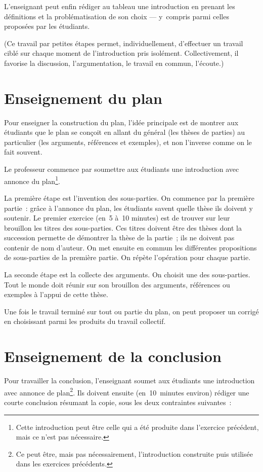\documentclass[a4paper,12pt]{report}
\begin{document}
L'enseignant peut enfin rédiger au tableau une introduction en prenant
les définitions et la problématisation de son choix — y compris parmi
celles proposées par les étudiants.

(Ce travail par petites étapes permet, individuellement, d'effectuer un
travail ciblé sur chaque moment de l'introduction pris isolément.
Collectivement, il favorise la discussion, l'argumentation, le travail
en commun, l'écoute.)


\chapter{Enseignement du plan}
\label{sec:orga70ca2f}

Pour enseigner la construction du plan, l'idée principale est de montrer
aux étudiants que le plan se conçoit en allant du général (les thèses de
parties) au particulier (les arguments, références et exemples), et non
l'inverse comme on le fait souvent.

Le professeur commence par soumettre aux étudiants une introduction avec
annonce du plan\footnote{Cette introduction peut être celle qui a été produite dans
l'exercice précédent, mais ce n'est pas nécessaire.}. 

La première étape est l'invention des sous-parties. On commence par la
première partie : grâce à l'annonce du plan, les étudiants savent quelle
thèse ils doivent y soutenir. Le premier exercice (en 5 à 10 minutes)
est de trouver sur leur brouillon les titres des sous-parties. Ces
titres doivent être des thèses dont la succession permette de démontrer
la thèse de la partie ; ils ne doivent pas contenir de nom d'auteur. On
met ensuite en commun les différentes propositions de sous-parties de la
première partie. On répète l'opération pour chaque partie.

La seconde étape est la collecte des arguments. On choisit une des
sous-parties. Tout le monde doit réunir sur son brouillon des arguments,
références ou exemples à l'appui de cette thèse.

Une fois le travail terminé sur tout ou partie du plan, on peut proposer
un corrigé en choisissant parmi les produits du travail collectif.


\chapter{Enseignement de la conclusion}
\label{sec:org2993af5}

Pour travailler la conclusion, l'enseignant soumet aux étudiants une
introduction avec annonce de plan\footnote{Ce peut être, mais pas nécessairement, l'introduction construite
puis utilisée dans les exercices précédents.}. Ils doivent ensuite
(en 10 minutes environ) rédiger une courte conclusion résumant la copie,
sous les deux contraintes suivantes : 
\end{document}
